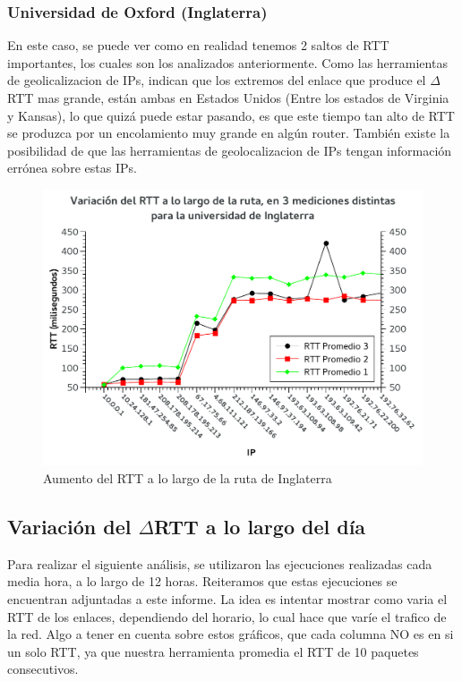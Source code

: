 \subsubsection{Universidad de Oxford (Inglaterra)}

En este caso, se puede ver como en realidad tenemos 2 saltos de RTT importantes, los cuales son los analizados anteriormente. Como las herramientas de geolicalizacion de IPs, indican que los extremos del enlace que produce el $\Delta$RTT mas grande, están ambas en Estados Unidos (Entre los estados de Virginia y Kansas), lo que quizá puede estar pasando, es que este tiempo tan alto de RTT se produzca por un encolamiento muy grande en algún router. También existe la posibilidad de que las herramientas de geolocalizacion de IPs tengan información errónea sobre estas IPs.

\begin{figure}[H]
  \begin{center}
    \includegraphics[]{graficos/inglaterra-rtts.pdf}
	\caption{Aumento del RTT a lo largo de la ruta de Inglaterra}
    \label{fig:rtts-inglaterra}  
  \end{center}
\end{figure}

\subsection{Variación del $\Delta$RTT a lo largo del día}

Para realizar el siguiente análisis, se utilizaron las ejecuciones realizadas cada media hora, a lo largo de 12 horas. Reiteramos que estas ejecuciones se encuentran adjuntadas a este informe. La idea es intentar mostrar como varia el RTT de los enlaces, dependiendo del horario, lo cual hace que varíe el trafico de la red. Algo a tener en cuenta sobre estos gráficos, que cada columna NO es en si un solo RTT, ya que nuestra herramienta promedia el RTT de 10 paquetes consecutivos.

